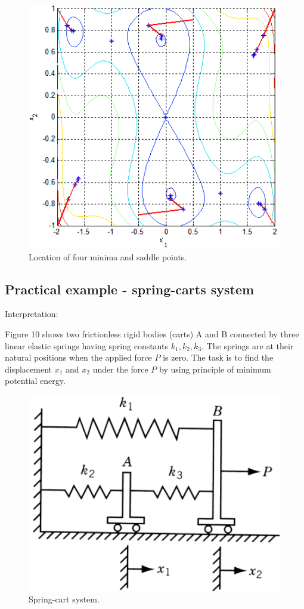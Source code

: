 \documentclass[12pt]{article}
\begin{document}
\begin{figure}[H]
	\includegraphics[width=16cm]{gem_results.png}
	\caption{Location of four minima and saddle points.}
\end{figure}		

\subsection{Practical example - spring-carts system}
Interpretation:

Figure 10 shows two frictionless rigid bodies (carts) A and B connected by three linear elastic springs having spring constants $k_1, k_2, k_3$. The springs are at their natural positions when the applied force $P$ is zero. The task is to find the displacement $x_1$ and $x_2$ under the force $P$ by using principle of minimum potential energy.\cite{practical}

\begin{figure}[H]
	\includegraphics[width=16cm]{springs.png}
	\caption{Spring-cart system.}
\end{figure}
\end{document}
